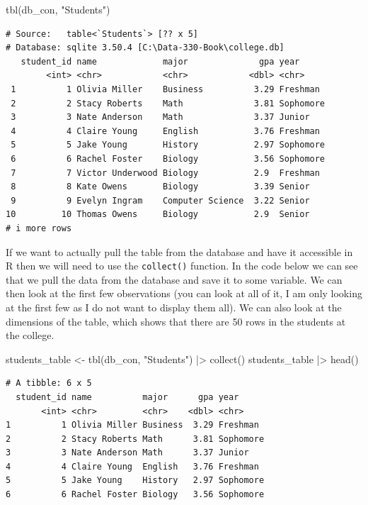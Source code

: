 \documentclass[
  letterpaper,
  DIV=11,
  numbers=noendperiod]{scrreprt}
\newenvironment{Shaded}{\begin{snugshade}}{\end{snugshade}}
\newcommand{\FunctionTok}[1]{\textcolor[rgb]{0.28,0.35,0.67}{#1}}
\newcommand{\NormalTok}[1]{\textcolor[rgb]{0.00,0.23,0.31}{#1}}
\newcommand{\OtherTok}[1]{\textcolor[rgb]{0.00,0.23,0.31}{#1}}
\newcommand{\SpecialCharTok}[1]{\textcolor[rgb]{0.37,0.37,0.37}{#1}}
\newcommand{\StringTok}[1]{\textcolor[rgb]{0.13,0.47,0.30}{#1}}
\begin{document}
\begin{Shaded}
\begin{Highlighting}[]
\FunctionTok{tbl}\NormalTok{(db\_con, }\StringTok{"Students"}\NormalTok{)}
\end{Highlighting}
\end{Shaded}

\begin{verbatim}
# Source:   table<`Students`> [?? x 5]
# Database: sqlite 3.50.4 [C:\Data-330-Book\college.db]
   student_id name             major              gpa year     
        <int> <chr>            <chr>            <dbl> <chr>    
 1          1 Olivia Miller    Business          3.29 Freshman 
 2          2 Stacy Roberts    Math              3.81 Sophomore
 3          3 Nate Anderson    Math              3.37 Junior   
 4          4 Claire Young     English           3.76 Freshman 
 5          5 Jake Young       History           2.97 Sophomore
 6          6 Rachel Foster    Biology           3.56 Sophomore
 7          7 Victor Underwood Biology           2.9  Freshman 
 8          8 Kate Owens       Biology           3.39 Senior   
 9          9 Evelyn Ingram    Computer Science  3.22 Senior   
10         10 Thomas Owens     Biology           2.9  Senior   
# i more rows
\end{verbatim}

If we want to actually pull the table from the database and have it
accessible in R then we will need to use the \texttt{collect()}
function. In the code below we can see that we pull the data from the
database and save it to some variable. We can then look at the first few
observations (you can look at all of it, I am only looking at the first
few as I do not want to display them all). We can also look at the
dimensions of the table, which shows that there are 50 rows in the
students at the college.

\begin{Shaded}
\begin{Highlighting}[]
\NormalTok{students\_table }\OtherTok{\textless{}{-}} \FunctionTok{tbl}\NormalTok{(db\_con, }\StringTok{"Students"}\NormalTok{) }\SpecialCharTok{|\textgreater{}} \FunctionTok{collect}\NormalTok{()}
\NormalTok{students\_table }\SpecialCharTok{|\textgreater{}} \FunctionTok{head}\NormalTok{()}
\end{Highlighting}
\end{Shaded}

\begin{verbatim}
# A tibble: 6 x 5
  student_id name          major      gpa year     
       <int> <chr>         <chr>    <dbl> <chr>    
1          1 Olivia Miller Business  3.29 Freshman 
2          2 Stacy Roberts Math      3.81 Sophomore
3          3 Nate Anderson Math      3.37 Junior   
4          4 Claire Young  English   3.76 Freshman 
5          5 Jake Young    History   2.97 Sophomore
6          6 Rachel Foster Biology   3.56 Sophomore
\end{verbatim}
\end{document}
